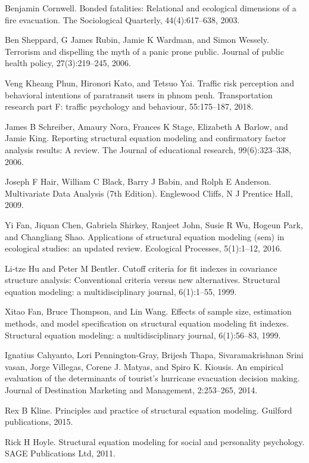 \documentclass[letterpaper,12pt,titlepage,oneside,final,a4j,dvipdfmx]{book}
\begin{document}
\begin{thebibliography}{60}
  Benjamin Cornwell. Bonded fatalities: Relational and ecological dimensions of a fire evacuation. The Sociological Quarterly, 44(4):617–638, 2003.

 Ben Sheppard, G James Rubin, Jamie K Wardman, and Simon Wessely. Terrorism and dispelling the myth of a panic prone public. Journal of public health policy, 27(3):219–245, 2006.

  Veng Kheang Phun, Hironori Kato, and Tetsuo Yai. Traffic risk perception and behavioral intentions of paratransit users in phnom penh. Transportation research part F: traffic psychology and behaviour, 55:175–187, 2018.


  James B Schreiber, Amaury Nora, Frances K Stage, Elizabeth A Barlow, and Jamie King. Reporting structural equation modeling and confirmatory factor analysis results: A review. The Journal of educational research, 99(6):323–338, 2006.

 Joseph F Hair, William C Black, Barry J Babin, and Rolph E Anderson. Multivariate Data Analysis (7th Edition). Englewood Cliffs, N J Prentice Hall, 2009.


 Yi Fan, Jiquan Chen, Gabriela Shirkey, Ranjeet John, Susie R Wu, Hogeun Park, and Changliang Shao. Applications of structural equation modeling (sem) in ecological studies: an updated review. Ecological Processes, 5(1):1–12, 2016.

 Li-tze Hu and Peter M Bentler. Cutoff criteria for fit indexes in covariance structure analysis: Conventional criteria versus new alternatives. Structural equation modeling: a multidisciplinary journal, 6(1):1–55, 1999.

 Xitao Fan, Bruce Thompson, and Lin Wang. Effects of sample size, estimation methods, and model specification on structural equation modeling fit indexes. Structural equation modeling: a multidisciplinary journal, 6(1):56–83, 1999.

 Ignatius Cahyanto, Lori Pennington-Gray, Brijesh Thapa, Sivaramakrishnan Srini vasan, Jorge Villegas, Corene J. Matyas, and Spiro K. Kiousis. An empirical evaluation of the determinants of tourist's hurricane evacuation decision making. Journal of Destination Marketing and Management, 2:253–265, 2014.

 Rex B Kline. Principles and practice of structural equation modeling. Guilford publications, 2015.

 Rick H Hoyle. Structural equation modeling for social and personality psychology. SAGE Publications Ltd, 2011.


\end{thebibliography}
\end{document}
